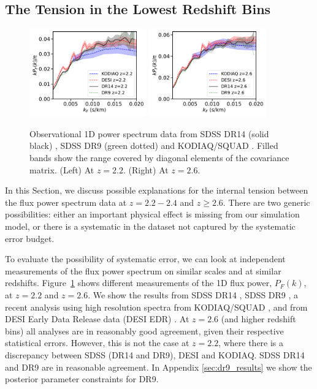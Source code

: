 \subsection{The Tension in the Lowest Redshift Bins}
\label{sec:tension}

\begin{figure}
    \centering
    \includegraphics[width=0.45\textwidth]{figures/lymandata-z2.2.pdf}
    \includegraphics[width=0.45\textwidth]{figures/lymandata-z2.6.pdf}
    \caption{\label{fig:p1d_data}
    Observational 1D power spectrum data from SDSS DR14 (solid black) \protect\cite{2019JCAP...07..017C}, SDSS DR9 (green dotted) \protect\cite{2013A&A...559A..85P} and KODIAQ/SQUAD \protect\cite{2022MNRAS.509.2842K}.
    Filled bands show the range covered by diagonal elements of the covariance matrix.
    (Left) At $z=2.2$.
    (Right) At $z=2.6$.}
\end{figure}

In this Section, we discuss possible explanations for the internal tension between the flux power spectrum data at $z=2.2 - 2.4$ and $z \geq 2.6$.
There are two generic possibilities: either an important physical effect is missing from our simulation model, or there is a systematic in the dataset not captured by the systematic error budget. 

To evaluate the possibility of systematic error, we can look at independent measurements of the flux power spectrum on similar scales and at similar redshifts.
Figure~\ref{fig:p1d_data} shows different measurements of the 1D flux power, $P_F(k)$, at $z=2.2$ and $z=2.6$.
We show the results from SDSS DR14 \cite{2019JCAP...07..017C}, SDSS DR9 \cite{2013A&A...559A..85P}, a recent analysis using high resolution spectra from KODIAQ/SQUAD \cite{2022MNRAS.509.2842K}, and from DESI Early Data Release data (DESI EDR) \cite{2023arXiv230606316G}.
At $z=2.6$ (and higher redshift bins) all analyses are in reasonably good agreement, given their respective statistical errors.
However, this is not the case at $z=2.2$, where there is a discrepancy between SDSS (DR14 and DR9), DESI and KODIAQ.
SDSS DR14 and DR9 are in reasonable agreement.
In Appendix \ref{sec:dr9_results} we show the posterior parameter constraints for DR9.

